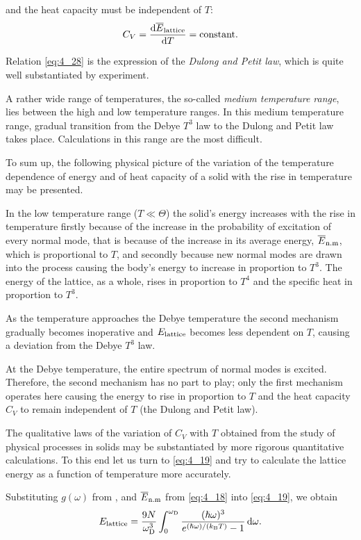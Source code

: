 \noindent
and the heat capacity must be independent of $T$:
\begin{equation}\label{eq:4_28}
    C_V = \dfrac{\mathrm{d}\overline{E}_{\text{lattice}}}{\mathrm{d} T} = \text{constant}.
\end{equation}

Relation \eqref{eq:4_28} is the expression of the \textit{Dulong and Petit law}, which is quite well substantiated by experiment.

A rather wide range of temperatures, the so-called \textit{medium temperature range}, lies between the high and low temperature ranges. In this medium temperature range, gradual transition from the Debye $T^3$ law to the Dulong and Petit law takes place. Calculations in this range are the most difficult.

To sum up, the following physical picture of the variation of the temperature dependence of energy and of heat capacity of a solid with the rise in temperature may be presented.

In the low temperature range ($T\ll\Theta$) the solid's energy increases with the rise in temperature firstly because of the increase in the probability of excitation of every normal mode, that is because of the increase in its average energy, $\overline{E}_{\text{n.m}}$, which is proportional to $T$, and secondly because new normal modes are drawn into the process causing the body's energy to increase in proportion to $T^3$. The energy of the lattice, as a whole, rises in proportion to $T^4$ and the specific heat in proportion to $T^3$.

As the temperature approaches the Debye temperature the second mechanism gradually becomes inoperative and $E_{\text{lattice}}$ becomes less dependent on $T$, causing a deviation from the Debye $T^3$ law.

At the Debye temperature, the entire spectrum of normal modes is excited. Therefore, the second mechanism has no part to play; only the first mechanism operates here causing the energy to rise in proportion to $T$ and the heat capacity $C_V$ to remain independent of $T$ (the Dulong and Petit law).

The qualitative laws of the variation of $C_V$ with $T$ obtained from the study of physical processes in solids may be substantiated by more rigorous quantitative calculations. To this end let us turn to \eqref{eq:4_19} and try to calculate the lattice energy as a function of temperature more accurately.

Substituting $g(\omega)$ from , and $\overline{E}_{\text{n.m}}$ from \eqref{eq:4_18} into \eqref{eq:4_19}, we obtain
\begin{equation}\label{eq:4_29}
    E_{\text{lattice}} = \frac{9N}{\omega_{\text{D}}^3} \int_0^{\omega_{\text{D}}} \frac{(\hslash\omega)^3}{e^{(\hslash\omega)/(k_{\text{B}}T)} - 1}\, \mathrm{d}\omega.
\end{equation}

